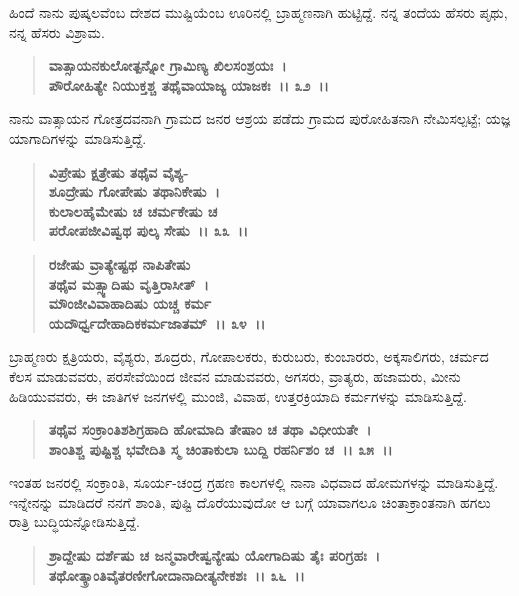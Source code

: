 ಹಿಂದೆ ನಾನು ಪುಷ್ಕಲವೆಂಬ ದೇಶದ ಮುಷ್ಟಿಯೆಂಬ ಊರಿನಲ್ಲಿ ಬ್ರಾಹ್ಮಣನಾಗಿ ಹುಟ್ಟಿದ್ದೆ. ನನ್ನ ತಂದೆಯ ಹೆಸರು ಪೃಥು, ನನ್ನ ಹೆಸರು ವಿಶ್ರಾಮ.

\begin{verse}
\textbf{ವಾತ್ಸಾಯನಕುಲೋತ್ಪನ್ನೋ ಗ್ರಾಮಿಣ್ಯ ಖಿಲಸಂಶ್ರಯಃ~।}\\\textbf{ಪೌರೋಹಿತ್ಯೇ ನಿಯುಕ್ತಶ್ಚ ತಥೈವಾಯಾಜ್ಯ ಯಾಜಕಃ~।। ೩೨~।।}
\end{verse}

ನಾನು ವಾತ್ಸಾಯನ ಗೋತ್ರದವನಾಗಿ ಗ್ರಾಮದ ಜನರ ಆಶ್ರಯ ಪಡೆದು ಗ್ರಾಮದ ಪುರೋಹಿತನಾಗಿ ನೇಮಿಸಲ್ಪಟ್ಟೆ; ಯಜ್ಞ ಯಾಗಾದಿಗಳನ್ನು ಮಾಡಿಸುತ್ತಿದ್ದೆ.

\begin{verse}
\textbf{ವಿಪ್ರೇಷು ಕ್ಷತ್ರೇಷು ತಥೈವ ವೈಶ್ಯ-}\\\textbf{ಶೂದ್ರೇಷು ಗೋಪೇಷು ತಥಾನಿಕೇಷು~।}\\\textbf{ಕುಲಾಲಹೈಮೇಷು ಚ ಚರ್ಮಕೇಷು ಚ} \\\textbf{ಪರೋಪಜೀವಿಷ್ವಥ ಪುಲ್ಕ ಸೇಷು~।। ೩೩~।।}
\end{verse}

\begin{verse}
\textbf{ರಜೇಷು ವ್ರಾತ್ಯೇಷ್ಟಥ ನಾಪಿತೇಷು}\\\textbf{ತಥೈವ ಮತ್ಸ್ಯಾದಿಷು ವೃತ್ತಿರಾಸೀತ್~।}\\\textbf{ಮೌಂಜೀವಿವಾಹಾದಿಷು ಯಚ್ಚ ಕರ್ಮ}\\\textbf{ಯದೌರ್ಧ್ವದೇಹಾದಿಕಕರ್ಮಜಾತಮ್~।। ೩೪~।।}
\end{verse}

ಬ್ರಾಹ್ಮಣರು ಕ್ಷತ್ರಿಯರು, ವೈಶ್ಯರು, ಶೂದ್ರರು, ಗೋಪಾಲಕರು, ಕುರುಬರು, ಕುಂಬಾರರು, ಅಕ್ಕಸಾಲಿಗರು, ಚರ್ಮದ ಕೆಲಸ ಮಾಡುವವರು, ಪರಸೇವೆಯಿಂದ ಜೀವನ ಮಾಡುವವರು, ಅಗಸರು, ವ್ರಾತ್ಯರು, ಹಜಾಮರು, ಮೀನು ಹಿಡಿಯುವವರು, ಈ ಜಾತಿಗಳ ಜನಗಳಲ್ಲಿ ಮುಂಜಿ, ವಿವಾಹ, ಉತ್ತರಕ್ರಿಯಾದಿ ಕರ್ಮಗಳನ್ನು ಮಾಡಿಸುತ್ತಿದ್ದೆ.

\begin{verse}
\textbf{ತಥೈವ ಸಂಕ್ರಾಂತಿಶಶಿಗ್ರಹಾದಿ ಹೋಮಾದಿ ತೇಷಾಂ ಚ ತಥಾ ವಿಧೀಯತೇ~।}\\\textbf{ಶಾಂತಿಶ್ಚ ಪುಷ್ಟಿಶ್ಚ ಭವೇದಿತಿ ಸ್ಮ ಚಿಂತಾಕುಲಾ ಬುದ್ದಿ ರಹರ್ನಿಶಂ ಚ~।। ೩೫~।।}
\end{verse}

ಇಂತಹ ಜನರಲ್ಲಿ ಸಂಕ್ರಾಂತಿ, ಸೂರ್ಯ-ಚಂದ್ರ ಗ್ರಹಣ ಕಾಲಗಳಲ್ಲಿ ನಾನಾ ವಿಧವಾದ ಹೋಮಗಳನ್ನು ಮಾಡಿಸುತ್ತಿದ್ದೆ. ಇನ್ನೇನನ್ನು ಮಾಡಿದರೆ ನನಗೆ ಶಾಂತಿ, ಪುಷ್ಟಿ ದೊರೆಯುವುದೋ ಆ ಬಗ್ಗೆ ಯಾವಾಗಲೂ ಚಿಂತಾಕ್ರಾಂತನಾಗಿ ಹಗಲು ರಾತ್ರಿ ಬುದ್ಧಿಯನ್ನೋಡಿಸುತ್ತಿದ್ದೆ.

\begin{verse}
\textbf{ಶ್ರಾದ್ದೇಷು ದರ್ಶೆಷು ಚ ಜನ್ಮವಾರೇಷ್ವನ್ಯೇಷು ಯೋಗಾದಿಷು ತೈಃ ಪರಿಗ್ರಹಃ~।}\\\textbf{ತಥೋತ್ಕ್ರಾಂತಿವೈತರಣೀಗೋದಾನಾದೀತ್ಯನೇಕಶಃ~।। ೩೬~।।}
\end{verse}

